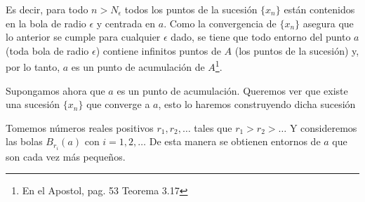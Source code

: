 \documentclass[fleqn,leqno,11pt,letterpaper,final]{article}
\begin{document}
Es decir, para todo $n>N_\epsilon$ todos los puntos de la sucesión $\{ x_n \}$ están contenidos
en la bola de radio $\epsilon$ y centrada en $a$. Como la convergencia de $\{ x_n \}$ asegura que lo
anterior se cumple para cualquier $\epsilon$ dado, se tiene que todo entorno del punto $a$ (toda
bola de radio $\epsilon$) contiene infinitos puntos de $A$ (los puntos de la sucesión) y,
por lo tanto, $a$ es un punto de acumulación de $A$\footnote{En el Apostol\cite{apostol_mathematical_1974}, pag. 53 Teorema 3.17}.

Supongamos ahora que $a$ es un punto de acumulación. Queremos ver que existe una
sucesión $\{ x_n \}$ que converge a $a$, esto lo haremos construyendo dicha sucesión

	
	
Tomemos números reales positivos $r_1,r_2,\dots$ tales que
$r_1>r_2>\dots$
Y consideremos las bolas $B_{r_i}(a)$ con $i=1,2,\dots$
De esta manera se obtienen entornos de $a$ que son cada vez más pequeños.
\end{document}
